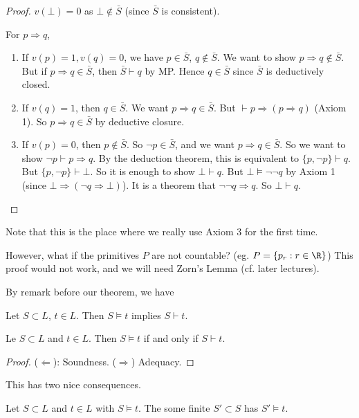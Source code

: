 \documentclass[a4paper]{article}
\begin{document}
\begin{proof}
  $v(\bot) = 0$ as $\bot \not\in \bar S$ (since $\bar S$ is consistent).

  For $p\Rightarrow q$,
  \begin{enumerate}
    \item If $v(p) = 1, v(q) = 0$, we have $p\in \bar S$, $q\not\in \bar S$. We want to show $p\Rightarrow q\not\in \bar S$. But if $p\Rightarrow q\in \bar S$, then $\bar S \vdash q$ by MP. Hence $q\in \bar S$ since $\bar S$ is deductively closed.
    \item If $v(q) = 1$, then $q\in \bar S$. We want $p\Rightarrow q\in \bar S$. But $\vdash p\Rightarrow (p\Rightarrow q)$ (Axiom 1). So $p\Rightarrow q \in \bar S$ by deductive closure.
    \item If $v(p) = 0$, then $p\not\in \bar S$. So $\neg p\in \bar S$, and we want $p\Rightarrow q\in \bar S$. So we want to show $\neg p\vdash p\Rightarrow q$. By the deduction theorem, this is equivalent to $\{p, \neg p\} \vdash q$. But $\{p, \neg p\}\vdash \bot$. So it is enough to show $\bot \vdash q$. But $\bot \models \neg \neg q$ by Axiom 1 (since $\bot \Rightarrow (\neg q\Rightarrow \bot)$). It is a theorem that $\neg \neg q\Rightarrow q$. So $\bot \vdash q$. 
  \end{enumerate}
\end{proof}
Note that this is the place where we really use Axiom 3 for the first time.

However, what if the primitives $P$ are not countable? (eg. $P = \{p_r: r\in \R\}$) This proof would not work, and we will need Zorn's Lemma (cf. later lectures).

By remark before our theorem, we have
\begin{cor}
  Let $S\subset L$, $t\in L$. Then $S\models t$ implies $S\vdash t$. 
\end{cor}

\begin{thm}
  Le $S\subset L$ and $t\in L$. Then $S\models t$ if and only if $S\vdash t$.
\end{thm}

\begin{proof}
  ($\Leftarrow$): Soundness. ($\Rightarrow $) Adequacy.
\end{proof}

This has two nice consequences.
\begin{cor}
  Let $S\subset L$ and $t\in L$ with $S\models t$. The some finite $S'\subset S$ has $S'\models t$.
\end{cor}
\end{document}
